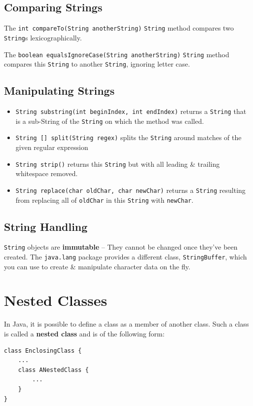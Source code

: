 \documentclass[a4paper,11pt]{article}
\begin{document}
\subsection{Comparing Strings}
The \texttt{int compareTo(String anotherString)} \verb|String| method compares two \verb|String|s lexicographically.

The \texttt{boolean equalsIgnoreCase(String anotherString)} \verb|String| method compares this \verb|String| to 
another \verb|String|, ignoring letter case.

\subsection{Manipulating Strings}
\begin{itemize}
    \item   \texttt{String substring(int beginIndex, int endIndex)} returns a \verb|String| that is a sub-String 
            of the \verb|String| on which the method was called.
    \item   \texttt{String [] split(String regex)} splits the \verb|String| around matches of the given 
            regular expression
    \item   \texttt{String strip()} returns this \verb|String| but with all leading \& trailing whitespace removed.
    \item   \texttt{String replace(char oldChar, char newChar)} returns a \verb|String| resulting from replacing all
            of \verb|oldChar| in this \verb|String| with \verb|newChar|.
\end{itemize}

\subsection{String Handling}
\verb|String| objects are \textbf{immutable} -- They cannot be changed once they've been created.
The \verb|java.lang| package provides a different class, \verb|StringBuffer|, which you can use to create \& manipulate 
character data on the fly.

\section{Nested Classes}
In Java, it is possible to define a class as a member of another class. 
Such a class is called a \textbf{nested class} and is of the following form:
\begin{verbatim}
class EnclosingClass {
    ...
    class ANestedClass {
        ...
    }
}
\end{verbatim}
\end{document}

